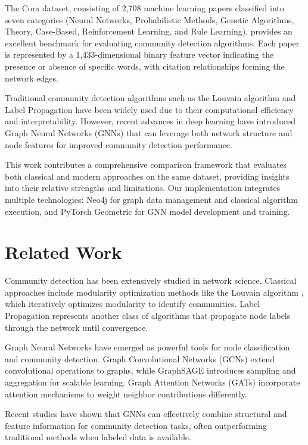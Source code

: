\documentclass[conference]{IEEEtran}
\begin{document}
The Cora dataset, consisting of 2,708 machine learning papers classified into seven categories (Neural Networks, Probabilistic Methods, Genetic Algorithms, Theory, Case-Based, Reinforcement Learning, and Rule Learning), provides an excellent benchmark for evaluating community detection algorithms. Each paper is represented by a 1,433-dimensional binary feature vector indicating the presence or absence of specific words, with citation relationships forming the network edges.

Traditional community detection algorithms such as the Louvain algorithm and Label Propagation have been widely used due to their computational efficiency and interpretability. However, recent advances in deep learning have introduced Graph Neural Networks (GNNs) that can leverage both network structure and node features for improved community detection performance.

This work contributes a comprehensive comparison framework that evaluates both classical and modern approaches on the same dataset, providing insights into their relative strengths and limitations. Our implementation integrates multiple technologies: Neo4j for graph data management and classical algorithm execution, and PyTorch Geometric for GNN model development and training.

\section{Related Work}

Community detection has been extensively studied in network science. Classical approaches include modularity optimization methods like the Louvain algorithm \cite{blondel2008fast}, which iteratively optimizes modularity to identify communities. Label Propagation \cite{raghavan2007near} represents another class of algorithms that propagate node labels through the network until convergence.

Graph Neural Networks have emerged as powerful tools for node classification and community detection. Graph Convolutional Networks (GCNs) \cite{kipf2016semi} extend convolutional operations to graphs, while GraphSAGE \cite{hamilton2017inductive} introduces sampling and aggregation for scalable learning. Graph Attention Networks (GATs) \cite{veličković2017graph} incorporate attention mechanisms to weight neighbor contributions differently.

Recent studies have shown that GNNs can effectively combine structural and feature information for community detection tasks, often outperforming traditional methods when labeled data is available.
\end{document}
